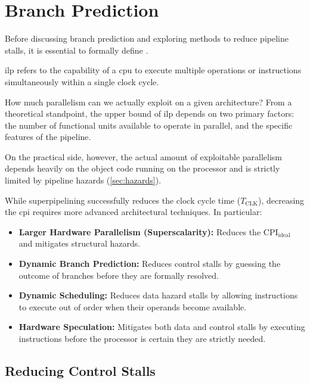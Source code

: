 \chapter{Branch Prediction}

Before discussing branch prediction and exploring methods to reduce pipeline stalls, it is essential to formally define .

\begin{definition}{}{ilp}
     refers to the capability of a \gls{cpu} to execute multiple operations or instructions simultaneously within a single clock cycle.
\end{definition}

How much parallelism can we actually exploit on a given architecture? From a theoretical standpoint, the upper bound of \gls{ilp} depends on two primary factors: the number of functional units available to operate in parallel, and the specific features of the pipeline. 

On the practical side, however, the actual amount of exploitable parallelism depends heavily on the object code running on the processor and is strictly limited by pipeline hazards (\cref{sec:hazards}). 

While superpipelining successfully reduces the clock cycle time (\(T_{\text{CLK}}\)), decreasing the \gls{cpi} requires more advanced architectural techniques. In particular:
\begin{itemize}
    \item \textbf{Larger Hardware Parallelism (Superscalarity):} Reduces the \(\text{CPI}_{\text{ideal}}\) and mitigates structural hazards.
    \item \textbf{Dynamic Branch Prediction:} Reduces control stalls by guessing the outcome of branches before they are formally resolved.
    \item \textbf{Dynamic Scheduling:} Reduces data hazard stalls by allowing instructions to execute out of order when their operands become available.
    \item \textbf{Hardware Speculation:} Mitigates both data and control stalls by executing instructions before the processor is certain they are strictly needed.
\end{itemize}

\section{Reducing Control Stalls}

